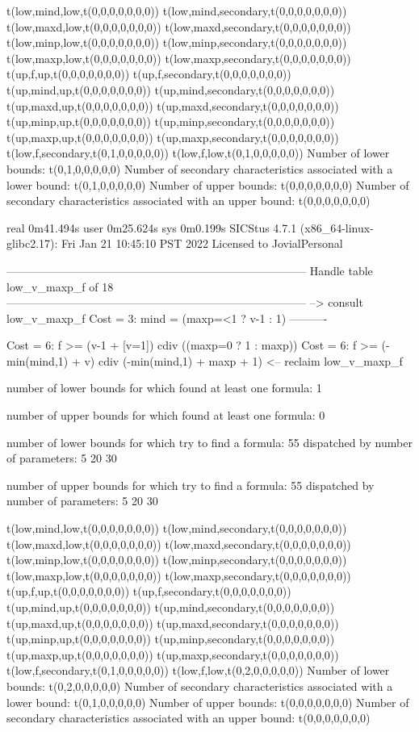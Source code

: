 t(low,mind,low,t(0,0,0,0,0,0,0))
t(low,mind,secondary,t(0,0,0,0,0,0,0))
t(low,maxd,low,t(0,0,0,0,0,0,0))
t(low,maxd,secondary,t(0,0,0,0,0,0,0))
t(low,minp,low,t(0,0,0,0,0,0,0))
t(low,minp,secondary,t(0,0,0,0,0,0,0))
t(low,maxp,low,t(0,0,0,0,0,0,0))
t(low,maxp,secondary,t(0,0,0,0,0,0,0))
t(up,f,up,t(0,0,0,0,0,0,0))
t(up,f,secondary,t(0,0,0,0,0,0,0))
t(up,mind,up,t(0,0,0,0,0,0,0))
t(up,mind,secondary,t(0,0,0,0,0,0,0))
t(up,maxd,up,t(0,0,0,0,0,0,0))
t(up,maxd,secondary,t(0,0,0,0,0,0,0))
t(up,minp,up,t(0,0,0,0,0,0,0))
t(up,minp,secondary,t(0,0,0,0,0,0,0))
t(up,maxp,up,t(0,0,0,0,0,0,0))
t(up,maxp,secondary,t(0,0,0,0,0,0,0))
t(low,f,secondary,t(0,1,0,0,0,0,0))
t(low,f,low,t(0,1,0,0,0,0,0))
Number of lower bounds:                                             t(0,1,0,0,0,0,0)
Number of secondary characteristics associated with a lower bound:  t(0,1,0,0,0,0,0)
Number of upper bounds:                                             t(0,0,0,0,0,0,0)
Number of secondary characteristics associated with an upper bound: t(0,0,0,0,0,0,0)

real	0m41.494s
user	0m25.624s
sys	0m0.199s
SICStus 4.7.1 (x86_64-linux-glibc2.17): Fri Jan 21 10:45:10 PST 2022
Licensed to JovialPersonal


--------------------------------------------------------------------------------
Handle table low_v_maxp_f of 18
--------------------------------------------------------------------------------
--> consult low_v_maxp_f
Cost =  3:  mind = (maxp=<1 ? v-1 : 1)
----------

Cost =  6:  f >= (v-1 + [v=1]) cdiv ((maxp=0 ? 1 : maxp)) %
Cost =  6:  f >= (-min(mind,1) + v) cdiv (-min(mind,1) + maxp + 1)
<-- reclaim low_v_maxp_f

number of lower bounds for which found at least one formula: 1

number of upper bounds for which found at least one formula: 0

number of lower bounds for which try to find a formula: 55
dispatched by number of parameters: 5  20  30

number of upper bounds for which try to find a formula: 55
dispatched by number of parameters: 5  20  30

t(low,mind,low,t(0,0,0,0,0,0,0))
t(low,mind,secondary,t(0,0,0,0,0,0,0))
t(low,maxd,low,t(0,0,0,0,0,0,0))
t(low,maxd,secondary,t(0,0,0,0,0,0,0))
t(low,minp,low,t(0,0,0,0,0,0,0))
t(low,minp,secondary,t(0,0,0,0,0,0,0))
t(low,maxp,low,t(0,0,0,0,0,0,0))
t(low,maxp,secondary,t(0,0,0,0,0,0,0))
t(up,f,up,t(0,0,0,0,0,0,0))
t(up,f,secondary,t(0,0,0,0,0,0,0))
t(up,mind,up,t(0,0,0,0,0,0,0))
t(up,mind,secondary,t(0,0,0,0,0,0,0))
t(up,maxd,up,t(0,0,0,0,0,0,0))
t(up,maxd,secondary,t(0,0,0,0,0,0,0))
t(up,minp,up,t(0,0,0,0,0,0,0))
t(up,minp,secondary,t(0,0,0,0,0,0,0))
t(up,maxp,up,t(0,0,0,0,0,0,0))
t(up,maxp,secondary,t(0,0,0,0,0,0,0))
t(low,f,secondary,t(0,1,0,0,0,0,0))
t(low,f,low,t(0,2,0,0,0,0,0))
Number of lower bounds:                                             t(0,2,0,0,0,0,0)
Number of secondary characteristics associated with a lower bound:  t(0,1,0,0,0,0,0)
Number of upper bounds:                                             t(0,0,0,0,0,0,0)
Number of secondary characteristics associated with an upper bound: t(0,0,0,0,0,0,0)

